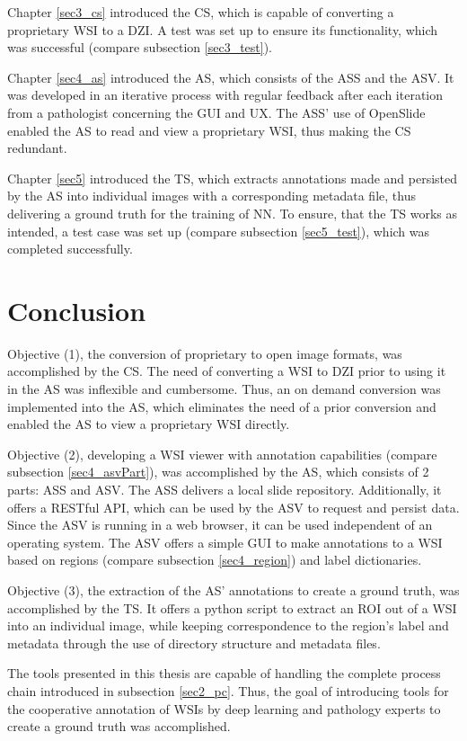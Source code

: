 Chapter \ref{sec3_cs} introduced the CS, which is capable of converting a proprietary WSI to a DZI. A test was set up to ensure its functionality, which was successful (compare subsection \ref{sec3_test}).

Chapter \ref{sec4_as} introduced the AS, which consists of the ASS and the ASV. It was developed in an iterative process with regular feedback after each iteration from a pathologist concerning the GUI and UX. The ASS' use of OpenSlide enabled the AS to read and view a proprietary WSI, thus making the CS redundant.

Chapter \ref{sec5} introduced the TS, which extracts annotations made and persisted by the AS into individual images with a corresponding metadata file, thus delivering a ground truth for the training of NN. To ensure, that the TS works as intended, a test case was set up (compare subsection \ref{sec5_test}), which was completed successfully.


\section{Conclusion}

Objective (1), the conversion of proprietary to open image formats, was accomplished by the CS. The need of converting a WSI to DZI prior to using it in the AS was inflexible and cumbersome. Thus, an on demand conversion was implemented into the AS, which eliminates the need of a prior conversion and enabled the AS to view a proprietary WSI directly.
 
Objective (2), developing a WSI viewer with annotation capabilities (compare subsection \ref{sec4_asvPart}), was accomplished by the AS, which consists of 2 parts: ASS and ASV. The ASS delivers a local slide repository. Additionally, it offers a RESTful API, which can be used by the ASV to request and persist data. Since the ASV is running in a web browser, it can be used independent of an operating system. The ASV offers a simple GUI to make annotations to a WSI based on regions (compare subsection \ref{sec4_region}) and label dictionaries.

Objective (3), the extraction of the AS' annotations to create a ground truth, was accomplished by the TS. It offers a python script to extract an ROI out of a WSI into an individual image, while keeping correspondence to the region's label and metadata through the use of directory structure and metadata files.

The tools presented in this thesis are capable of handling the complete process chain introduced in subsection \ref{sec2_pc}. Thus, the goal of introducing tools for the cooperative annotation of WSIs by deep learning and pathology experts to create a ground truth was accomplished.



